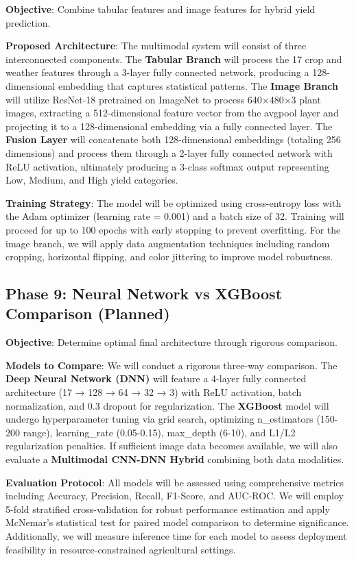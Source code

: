 \documentclass[10pt,twocolumn]{article}
\begin{document}
\textbf{Objective}: Combine tabular features and image features for hybrid yield prediction.

\textbf{Proposed Architecture}: The multimodal system will consist of three interconnected components. The \textbf{Tabular Branch} will process the 17 crop and weather features through a 3-layer fully connected network, producing a 128-dimensional embedding that captures statistical patterns. The \textbf{Image Branch} will utilize ResNet-18 pretrained on ImageNet to process 640×480×3 plant images, extracting a 512-dimensional feature vector from the avgpool layer and projecting it to a 128-dimensional embedding via a fully connected layer. The \textbf{Fusion Layer} will concatenate both 128-dimensional embeddings (totaling 256 dimensions) and process them through a 2-layer fully connected network with ReLU activation, ultimately producing a 3-class softmax output representing Low, Medium, and High yield categories.

\textbf{Training Strategy}: The model will be optimized using cross-entropy loss with the Adam optimizer (learning rate = 0.001) and a batch size of 32. Training will proceed for up to 100 epochs with early stopping to prevent overfitting. For the image branch, we will apply data augmentation techniques including random cropping, horizontal flipping, and color jittering to improve model robustness.

\subsection{Phase 9: Neural Network vs XGBoost Comparison (Planned)}

\textbf{Objective}: Determine optimal final architecture through rigorous comparison.

\textbf{Models to Compare}: We will conduct a rigorous three-way comparison. The \textbf{Deep Neural Network (DNN)} will feature a 4-layer fully connected architecture (17 → 128 → 64 → 32 → 3) with ReLU activation, batch normalization, and 0.3 dropout for regularization. The \textbf{XGBoost} model will undergo hyperparameter tuning via grid search, optimizing n\_estimators (150-200 range), learning\_rate (0.05-0.15), max\_depth (6-10), and L1/L2 regularization penalties. If sufficient image data becomes available, we will also evaluate a \textbf{Multimodal CNN-DNN Hybrid} combining both data modalities.

\textbf{Evaluation Protocol}: All models will be assessed using comprehensive metrics including Accuracy, Precision, Recall, F1-Score, and AUC-ROC. We will employ 5-fold stratified cross-validation for robust performance estimation and apply McNemar's statistical test for paired model comparison to determine significance. Additionally, we will measure inference time for each model to assess deployment feasibility in resource-constrained agricultural settings.
\end{document}
